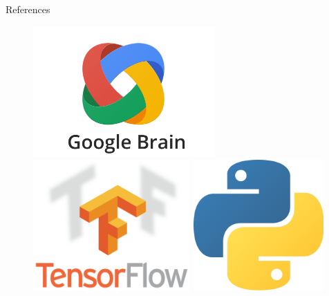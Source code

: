 \documentclass[22pt]{beamer}
\begin{document}
\begin{frame}[fragile]
\begin{textblock}{3.5}
\begin{block}{References}

{\scriptsize
}
\end{block}

\begin{figure}[htbp]
\centering
\includegraphics[height=5cm]{googlebrain-logo.png}
\hspace{1cm}
\includegraphics[height=5cm]{tensorflow-logo.png}
\hspace{1cm}
\includegraphics[height=5cm]{python-logo.png}

\end{figure}
\end{textblock}
\end{frame}
\end{document}
